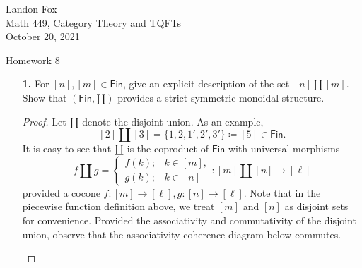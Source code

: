 \documentclass[ 12pt ]{article}
\begin{document}
\noindent Landon Fox \\
\noindent Math 449, Category Theory and TQFTs \\
\noindent October 20, 2021

\begin{center}
\Large Homework 8
\end{center}

\begin{enumerate}

	\item[\textbf{1.}] For $[n], [m] \in \mathsf{Fin}$, give an explicit description of the set $[n] \amalg [m]$. Show that $(\mathsf{Fin}, \amalg)$ provides a strict symmetric monoidal structure.

		\begin{proof}
			Let $\amalg$ denote the disjoint union. As an example, $$[2] \amalg [3] = \{ 1, 2, 1', 2', 3' \} \coloneqq [5] \in \mathsf{Fin}.$$ It is easy to see that $\amalg$ is the coproduct of $\mathsf{Fin}$ with universal morphisms $$f \amalg g = \begin{cases} f(k); & k \in [m], \\ g(k); & k \in [n] \end{cases} : [m] \amalg [n] \to [\ell]$$ provided a cocone $f : [m] \to [\ell], g : [n] \to [\ell]$. Note that in the piecewise function definition above, we treat $[m]$ and $[n]$ as disjoint sets for convenience. Provided the associativity and commutativity of the disjoint union, observe that the associativity coherence diagram below commutes.
			\begin{center}
\end{center}
\end{proof}
\end{enumerate}
\end{document}
